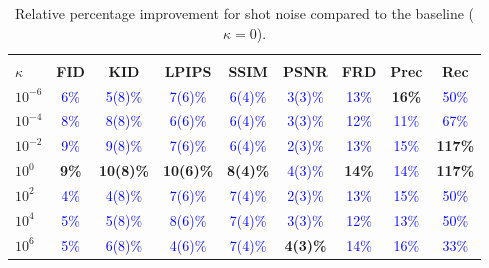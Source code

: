 \documentclass[twoside,11pt]{article}
\begin{document}
\begin{table}[ht!]
\centering
\renewcommand{\arraystretch}{1.4}
\setlength{\tabcolsep}{6pt}
\small
\begin{tabular}{lcccccccc}
\toprule
\rowcolor{gray!20}
\multicolumn{9}{c}{\textbf{Poisson Shot Noise - Relative Improvement}} \\
\textbf{$\kappa$} & \textbf{FID} & \textbf{KID} & \textbf{LPIPS} & \textbf{SSIM} & \textbf{PSNR} & \textbf{FRD} & \textbf{Prec} & \textbf{Rec} \\
\midrule
$10^{-6}$    & \textcolor{blue}{6\%} & \textcolor{blue}{5(8)\%} & \textcolor{blue}{7(6)\%} & \textcolor{blue}{6(4)\%} & \textcolor{blue}{3(3)\%} & \textcolor{blue}{13\%} & \textbf{\textcolor{green!50!black}{16\%}} & \textcolor{blue}{50\%} \\
$10^{-4}$    & \textcolor{blue}{8\%} & \textcolor{blue}{8(8)\%} & \textcolor{blue}{6(6)\%} & \textcolor{blue}{6(4)\%} & \textcolor{blue}{3(3)\%} & \textcolor{blue}{12\%} & \textcolor{blue}{11\%} & \textcolor{blue}{67\%} \\
$10^{-2}$    & \textcolor{blue}{9\%} & \textcolor{blue}{9(8)\%} & \textcolor{blue}{7(6)\%} & \textcolor{blue}{6(4)\%} & \textcolor{blue}{2(3)\%} & \textcolor{blue}{13\%} & \textcolor{blue}{15\%} & \textbf{\textcolor{green!50!black}{117\%}} \\
$10^{0}$     & \textbf{\textcolor{green!50!black}{9\%}} & \textbf{\textcolor{green!50!black}{10(8)\%}} & \textbf{\textcolor{green!50!black}{10(6)\%}} & \textbf{\textcolor{green!50!black}{8(4)\%}} & \textcolor{blue}{4(3)\%} & \textbf{\textcolor{green!50!black}{14\%}} & \textcolor{blue}{14\%} & \textbf{\textcolor{green!50!black}{117\%}} \\
$10^{2}$     & \textcolor{blue}{4\%} & \textcolor{blue}{4(8)\%} & \textcolor{blue}{7(6)\%} & \textcolor{blue}{7(4)\%} & \textcolor{blue}{2(3)\%} & \textcolor{blue}{13\%} & \textcolor{blue}{15\%} & \textcolor{blue}{50\%} \\
$10^{4}$     & \textcolor{blue}{5\%} & \textcolor{blue}{5(8)\%} & \textcolor{blue}{8(6)\%} & \textcolor{blue}{7(4)\%} & \textcolor{blue}{3(3)\%} & \textcolor{blue}{12\%} & \textcolor{blue}{13\%} & \textcolor{blue}{50\%} \\
$10^{6}$     & \textcolor{blue}{5\%} & \textcolor{blue}{6(8)\%} & \textcolor{blue}{4(6)\%} & \textcolor{blue}{7(4)\%} & \textbf{\textcolor{green!50!black}{4(3)\%}} & \textcolor{blue}{14\%} & \textcolor{blue}{16\%} & \textcolor{blue}{33\%} \\
\bottomrule
\end{tabular}
\caption{Relative percentage improvement for shot noise compared to the baseline ($\kappa = 0$).}
\label{tab:robustness_shot_noise_rel}
\end{table}
\end{document}
